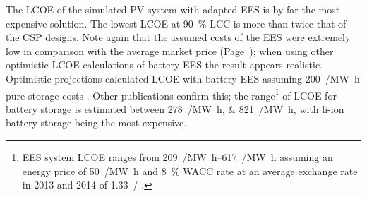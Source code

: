 
The \ac{LCOE} of the simulated \ac{PV} system with adapted \ac{EES} is by far the most expensive solution. The lowest \ac{LCOE} at \SI{90}{\percent} \ac{LCC} is more than twice that of the \ac{CSP} designs. Note again that the assumed costs of the \ac{EES} were extremely low in comparison with the average market price (Page~\pageref{SUBSUBPVFinancialparameter}); when using other optimistic \ac{LCOE} calculations of battery \ac{EES} the result appears realistic. Optimistic projections calculated \ac{LCOE} with battery \ac{EES} assuming \SI{200}{\usd/\mega\watt\hour} pure storage costs \cite{Corcuera2015}. Other publications confirm this; the range\footnote{\ac{EES} system \ac{LCOE} ranges from \SIrange{209}{617}{\eur/\mega\watt\hour} assuming an energy price of \SI{50}{\eur/\mega\watt\hour} and \SI{8}{\percent} \ac{WACC} rate \cite{Zakeri2015} at an average exchange rate in 2013 and 2014 of \SI{1.33}{\usd/\eur} \cite{StatistaGmbH2015}.} of \ac{LCOE} for battery storage is estimated between \SIlist{278;821}{\usd/\mega\watt\hour}, with \ac{li-ion} battery storage being the most expensive.



